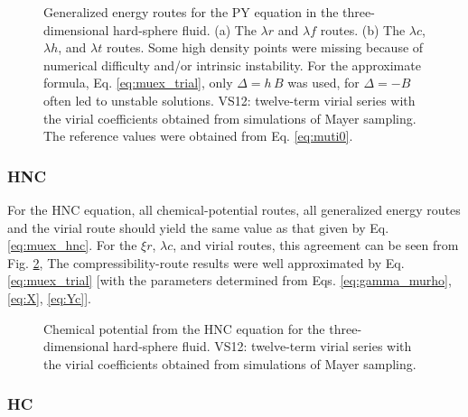 \documentclass[aip,jcp,reprint,superscriptaddress]{revtex4-1}
\begin{document}
\begin{figure}[h]
  \caption{
    \label{fig:muhspylam}
    Generalized energy routes
    for the PY equation
    in the three-dimensional hard-sphere fluid.
    (a)
    The $\lambda r$ and
    $\lambda f$ routes.
    (b)
    The $\lambda c$,
    $\lambda h$,
    and
    $\lambda t$ routes.
    Some high density points were missing
    because of numerical difficulty
    and/or intrinsic instability.
    For the approximate formula,
    Eq. \eqref{eq:muex_trial},
    only $\Delta = h \, B$ was used,
    for $\Delta = -B$ often led to
    unstable solutions.
    VS12: twelve-term virial series
    with the virial coefficients obtained
    from simulations of Mayer sampling\cite{
    schultz2014}.
    The reference values were obtained
    from Eq. \eqref{eq:muti0}.
  }
\end{figure}






\subsubsection{HNC}





For the HNC equation,
all chemical-potential routes,
all generalized energy routes
and the virial route
should yield the same value
as that given by
Eq. \eqref{eq:muex_hnc}.
%
For the $\xi r$, $\lambda c$,
and virial routes,
this agreement can be seen
from Fig. \ref{fig:muhshnc},
%
The compressibility-route results
were well approximated by
Eq. \eqref{eq:muex_trial}
[with the parameters determined from
Eqs.
\eqref{eq:gamma_murho},
\eqref{eq:X},
\eqref{eq:Yc}].
%


\begin{figure}[h]
  \caption{
    \label{fig:muhshnc}
    Chemical potential from the HNC equation
    for the three-dimensional hard-sphere fluid.
    VS12: twelve-term virial series
    with the virial coefficients obtained
    from simulations of Mayer sampling\cite{
    schultz2014}.
  }
\end{figure}




\subsubsection{HC}
\end{document}

